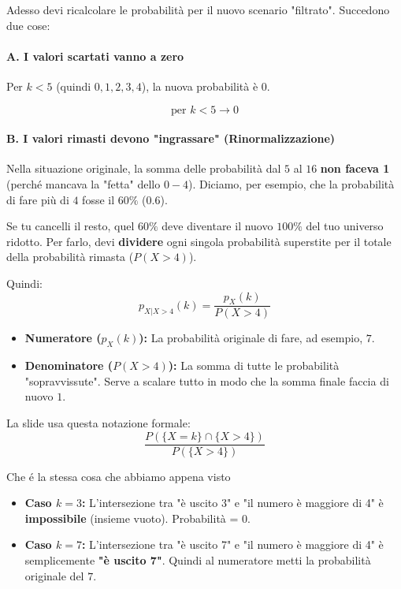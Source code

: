 Adesso devi ricalcolare le probabilità per il nuovo scenario "filtrato". Succedono due cose:

\paragraph{A. I valori scartati vanno a zero}

Per $k < 5$ (quindi $0, 1, 2, 3, 4$), la nuova probabilità è $0$.

\[ \text{per } k < 5 \to 0 \]

\paragraph{B. I valori rimasti devono "ingrassare" (Rinormalizzazione)}


Nella situazione originale, la somma delle probabilità dal $5$ al $16$ \textbf{non faceva 1} (perché mancava la "fetta" dello $0-4$). Diciamo, per esempio, che la probabilità di fare più di $4$ fosse il $60\%$ ($0.6$).

Se tu cancelli il resto, quel $60\%$ deve diventare il nuovo $100\%$ del tuo universo ridotto.
Per farlo, devi \textbf{dividere} ogni singola probabilità superstite per il totale della probabilità rimasta ($P(X > 4)$).

Quindi:
\begin{equation}
p_{X|X>4}(k) = \frac{p_X(k)}{P(X > 4)}
\end{equation}

\begin{itemize}
    \item \textbf{Numeratore ($p_X(k)$):} La probabilità originale di fare, ad esempio, $7$.
    \item \textbf{Denominatore ($P(X > 4)$):} La somma di tutte le probabilità "sopravvissute". Serve a scalare tutto in modo che la somma finale faccia di nuovo $1$.
\end{itemize}

La slide usa questa notazione formale:
\[
\frac{P(\{X = k\} \cap \{X > 4\})}{P(\{X > 4\})}
\]

Che é la stessa cosa che abbiamo appena visto 
\begin{itemize}
    \item \textbf{Caso $k = 3$:} L'intersezione tra "è uscito 3" e "il numero è maggiore di 4" è \textbf{impossibile} (insieme vuoto). Probabilità = $0$.
    \item \textbf{Caso $k = 7$:} L'intersezione tra "è uscito 7" e "il numero è maggiore di 4" è semplicemente \textbf{"è uscito 7"}. Quindi al numeratore metti la probabilità originale del $7$.
\end{itemize}


